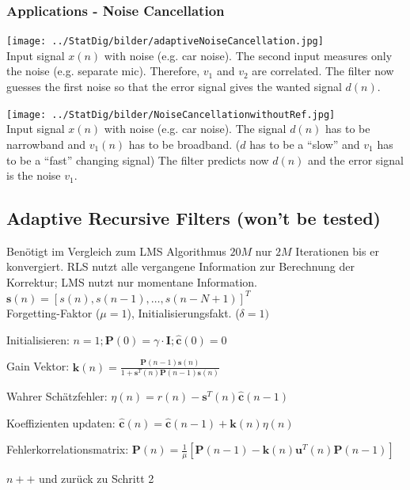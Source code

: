 \subsubsection{Applications - Noise Cancellation }
\begin{minipage}{9cm}
        \texttt{[image: ../StatDig/bilder/adaptiveNoiseCancellation.jpg]}\\
        Input signal $x(n)$ with noise (e.g. car noise). 
        The second input measures only the noise (e.g. separate mic). Therefore, $v_1$ and $v_2$ are correlated.
        The filter now guesses the first noise so that the error signal gives the wanted signal $d(n)$.     
\end{minipage}
\hspace{3mm}
\begin{minipage}{9cm}
        \texttt{[image: ../StatDig/bilder/NoiseCancellationwithoutRef.jpg]}\\
        Input signal $x(n)$ with noise (e.g. car noise). The signal $d(n)$ has to be narrowband and $v_1(n)$ has to be broadband. ($d$ has to be a ``slow''  and $v_1$ has to be a ``fast'' changing signal)
        The filter predicts now $d(n)$ and the error signal is the noise $v_1$.
\end{minipage}

\subsection{Adaptive Recursive Filters (won't be tested) }
\begin{minipage}{8.4cm}
	Benötigt im Vergleich zum LMS Algorithmus $20M$ nur $2M$ Iterationen bis er konvergiert. RLS nutzt alle vergangene 
	Information zur Berechnung der Korrektur; LMS nutzt nur momentane Information. \\
	$\mathbf{s}(n) = [s(n), s(n-1), \ldots, s(n - N + 1)]^T$ \\
	Forgetting-Faktor ($\mu=1$),
	Initialisierungsfakt. ($\delta = 1)$
\end{minipage}
\begin{minipage}{11cm}
	\begin{aufzaehlung}
	    \item Initialisieren: $n=1; \mathbf{P}(0)=\gamma \cdot \mathbf{I}; \mathbf{\hat{c}}(0)=0$
	    \item Gain Vektor: $ \mathbf{k}(n) = \frac{\mathbf{P}(n-1)\mathbf{s}(n)}{1 + \mathbf{s}^T(n) \mathbf{P}(n-1) \mathbf{s}(n)}$
	    \item Wahrer Schätzfehler: $\eta(n) = r(n) - \mathbf{s}^T(n) \mathbf{\hat{c}}(n-1)$
	    \item Koeffizienten updaten: $\mathbf{\hat{c}}(n) = \mathbf{\hat{c}}(n-1) + \mathbf{k}(n) \eta(n)$
	    \item Fehlerkorrelationsmatrix: \small $\mathbf P(n) = \frac1\mu [ \mathbf P (n-1) - \mathbf k (n) \mathbf u^T (n) \mathbf P(n-1)]$
\normalsize	    \item $n++$ und zurück zu Schritt 2
	\end{aufzaehlung}
\end{minipage}

